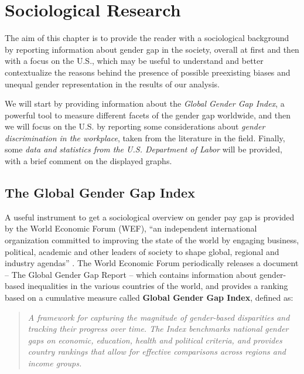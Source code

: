 \chapter{Sociological Research}
\label{chapter3}
\thispagestyle{empty}

The aim of this chapter is to provide the reader with a sociological background by reporting information about gender gap in the society, overall at first and then with a focus on the U.S., which may be useful to understand and better contextualize the reasons behind the presence of possible preexisting biases and unequal gender representation in the results of our analysis.

We will start by providing information about the \textit{Global Gender Gap Index}, a powerful tool to measure different facets of the gender gap worldwide, and then we will focus on the U.S. by reporting some considerations about \textit{gender discrimination in the workplace}, taken from the literature in the field. Finally, some \textit{data and statistics from the U.S. Department of Labor} will be provided, with a brief comment on the displayed graphs.


\section{The Global Gender Gap Index}
A useful instrument to get a sociological overview on gender pay gap is provided by the World Economic Forum (WEF), ``an independent international organization committed to improving the state of the world by engaging business, political, academic and other leaders of society to shape global, regional and industry agendas'' \cite{world2021terms}. The World Economic Forum periodically releases a document -- The Global Gender Gap Report -- which contains information about gender-based inequalities in the various countries of the world, and provides a ranking based on a cumulative measure called \textbf{Global Gender Gap Index}, defined as:
\begin{quote}\emph{A framework for capturing the magnitude of gender-based disparities and tracking their progress over time. The Index benchmarks national gender gaps on economic, education, health and political criteria, and provides country rankings that allow for effective comparisons across regions and income groups.} \cite[p.~3]{schwab2017global}
\end{quote}

